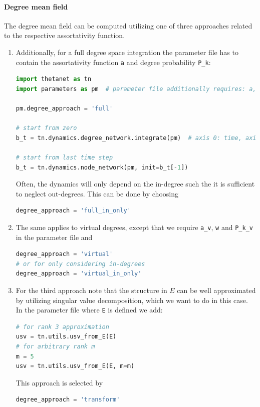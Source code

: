 \documentclass[bibliography=totoc, twoside]{article}
\numberwithin{equation}{section}
\begin{document}
\paragraph*{Degree mean field}
The degree mean field can be computed utilizing one of three approaches related to the respective assortativity function.
\begin{enumerate}
    \item Additionally, for a full degree space integration the parameter file has to contain the assortativity function \texttt{a} and degree probability \texttt{P\_k}:
\begin{lstlisting}[language=python]
import thetanet as tn
import parameters as pm  # parameter file additionally requires: a, P_k

pm.degree_approach = 'full'

# start from zero
b_t = tn.dynamics.degree_network.integrate(pm)  # axis 0: time, axis 1: degrees

# start from last time step
b_t = tn.dynamics.node_network(pm, init=b_t[-1])
\end{lstlisting}
    Often, the dynamics will only depend on the in-degree such the it is sufficient to neglect out-degrees.
    This can be done by choosing
\begin{lstlisting}[language=python]
degree_approach = 'full_in_only'
\end{lstlisting}

    \item The same applies to virtual degrees, except that we require \texttt{a\_v}, \texttt{w} and \texttt{P\_k\_v} in the parameter file and
\begin{lstlisting}[language=python]
degree_approach = 'virtual'
# or for only considering in-degrees
degree_approach = 'virtual_in_only'
\end{lstlisting}

    \item For the third approach note that the structure in $E$ can be well approximated by utilizing singular value decomposition, which we want to do in this case.
In the parameter file where \texttt{E} is defined we add:
\begin{lstlisting}[language=python]
# for rank 3 approximation
usv = tn.utils.usv_from_E(E)
# for arbitrary rank m
m = 5
usv = tn.utils.usv_from_E(E, m=m)
\end{lstlisting}
    This approach is selected by
\begin{lstlisting}[language=python]
degree_approach = 'transform'
\end{lstlisting}
\end{enumerate}
\end{document}
